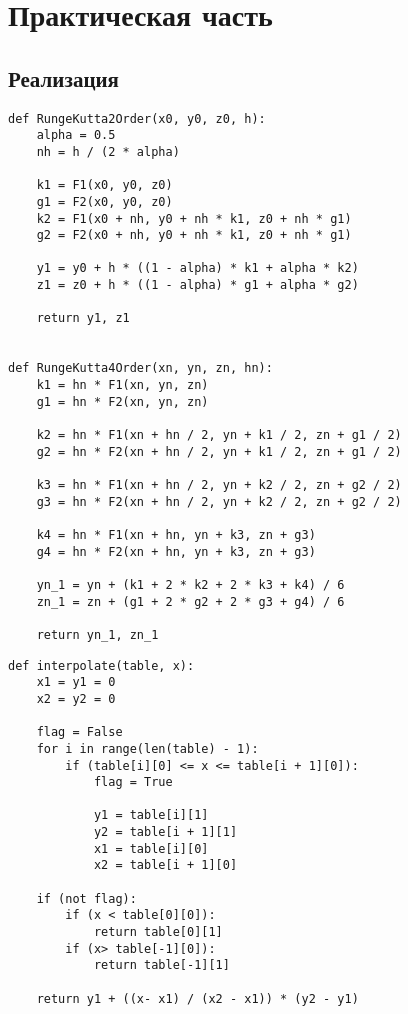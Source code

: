 \chapter{Практическая часть}

\section{Реализация}
\lstset{language=python}
\begin{lstlisting}[caption={Методы Рунге-Кутта второго и четвёртого порядков точности},label={lst:rungekutta}]
def RungeKutta2Order(x0, y0, z0, h):
    alpha = 0.5
    nh = h / (2 * alpha)

    k1 = F1(x0, y0, z0)
    g1 = F2(x0, y0, z0)
    k2 = F1(x0 + nh, y0 + nh * k1, z0 + nh * g1)
    g2 = F2(x0 + nh, y0 + nh * k1, z0 + nh * g1)

    y1 = y0 + h * ((1 - alpha) * k1 + alpha * k2)
    z1 = z0 + h * ((1 - alpha) * g1 + alpha * g2)

    return y1, z1


def RungeKutta4Order(xn, yn, zn, hn):
    k1 = hn * F1(xn, yn, zn)
    g1 = hn * F2(xn, yn, zn)

    k2 = hn * F1(xn + hn / 2, yn + k1 / 2, zn + g1 / 2)
    g2 = hn * F2(xn + hn / 2, yn + k1 / 2, zn + g1 / 2)

    k3 = hn * F1(xn + hn / 2, yn + k2 / 2, zn + g2 / 2)
    g3 = hn * F2(xn + hn / 2, yn + k2 / 2, zn + g2 / 2)

    k4 = hn * F1(xn + hn, yn + k3, zn + g3)
    g4 = hn * F2(xn + hn, yn + k3, zn + g3)

    yn_1 = yn + (k1 + 2 * k2 + 2 * k3 + k4) / 6
    zn_1 = zn + (g1 + 2 * g2 + 2 * g3 + g4) / 6

    return yn_1, zn_1
\end{lstlisting}
\begin{lstlisting}[caption={Интерполяция},label={lst:interpolation}]
def interpolate(table, x):
    x1 = y1 = 0
    x2 = y2 = 0

    flag = False
    for i in range(len(table) - 1):
        if (table[i][0] <= x <= table[i + 1][0]):
            flag = True

            y1 = table[i][1]
            y2 = table[i + 1][1]
            x1 = table[i][0]
            x2 = table[i + 1][0]

    if (not flag):
        if (x < table[0][0]):
            return table[0][1]
        if (x> table[-1][0]):
            return table[-1][1]

    return y1 + ((x- x1) / (x2 - x1)) * (y2 - y1)
\end{lstlisting}
